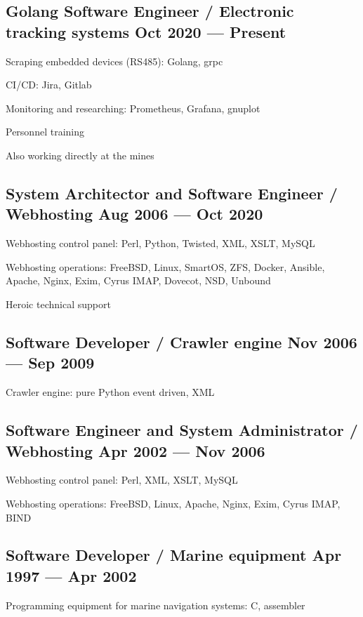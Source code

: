 \documentclass[letter,10pt]{article}
\begin{document}
\subsection{{Golang Software Engineer / Electronic tracking systems \hfill Oct 2020 --- Present}}
\begin{zitemize}
\item Scraping embedded devices (RS485): Golang, grpc
\item CI/CD: Jira, Gitlab
\item Monitoring and researching: Prometheus, Grafana, gnuplot
\item Personnel training
\item Also working directly at the mines
\end{zitemize}

\subsection{{System Architector and Software Engineer / Webhosting \hfill Aug 2006 --- Oct 2020}}
\begin{zitemize}
\item Webhosting control panel: Perl, Python, Twisted, XML, XSLT, MySQL
\item Webhosting operations: FreeBSD, Linux, SmartOS, ZFS, Docker, Ansible, Apache, Nginx, Exim, Cyrus IMAP, Dovecot, NSD, Unbound
\item Heroic technical support
\end{zitemize}

\subsection{{Software Developer / Crawler engine \hfill Nov 2006 --- Sep 2009}}
\begin{zitemize}
\item Crawler engine: pure Python event driven, XML
\end{zitemize}

\subsection{{Software Engineer and System Administrator / Webhosting \hfill Apr 2002 --- Nov 2006}}
\begin{zitemize}
\item Webhosting control panel: Perl, XML, XSLT, MySQL
\item Webhosting operations: FreeBSD, Linux, Apache, Nginx, Exim, Cyrus IMAP, BIND
\end{zitemize}

\subsection{{Software Developer / Marine equipment \hfill Apr 1997 --- Apr 2002}}
\begin{zitemize}
\item Programming equipment for marine navigation systems: C, assembler
\end{zitemize}
\end{document}
